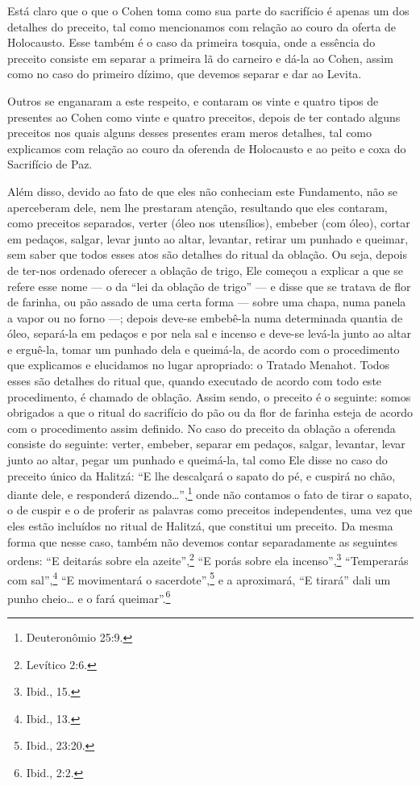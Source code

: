 Está claro que o que o Cohen toma como sua parte do sacrifício é
apenas um dos detalhes do preceito, tal como mencionamos com relação ao
couro da oferta de Holocausto. Esse também é o caso da primeira tosquia,
onde a essência do preceito consiste em separar a primeira lã do
carneiro e dá-la ao Cohen, assim como no caso do primeiro dízimo,
que devemos separar e dar ao Levita.

Outros se enganaram a este respeito, e contaram os vinte e quatro tipos
de presentes ao Cohen como vinte e quatro preceitos, depois de ter
contado alguns preceitos nos quais alguns desses presentes eram meros
detalhes, tal como explicamos com relação ao couro da oferenda de
Holocausto e ao peito e coxa do Sacrifício de Paz.

Além disso, devido ao fato de que eles não conheciam este Fundamento,
não se aperceberam dele, nem lhe prestaram atenção, resultando que eles
contaram, como preceitos separados, verter (óleo nos utensílios),
embeber (com óleo), cortar em pedaços, salgar, levar junto ao altar,
levantar, retirar um punhado e queimar, sem saber que todos esses atos
são detalhes do ritual da oblação. Ou seja, depois de ter-nos ordenado
oferecer a oblação de trigo, Ele começou a explicar a que se refere esse
nome --- o da ``lei da oblação de trigo'' --- e disse que se tratava de
flor de farinha, ou pão assado de uma certa forma --- sobre uma chapa,
numa panela a vapor ou no forno ---; depois deve-se embebê-la numa
determinada quantia de óleo, separá-la em pedaços e por nela sal e
incenso e deve-se levá-la junto ao altar e erguê-la, tomar um punhado
dela e queimá-la, de acordo com o procedimento que explicamos e
elucidamos no lugar apropriado: o Tratado Menahot. Todos esses são
detalhes do ritual que, quando executado de acordo com todo este
procedimento, é chamado de oblação. Assim sendo, o preceito é o
seguinte: somos obrigados a que o ritual do sacrifício do pão ou da flor
de farinha esteja de acordo com o procedimento assim definido. No caso
do preceito da oblação a oferenda consiste do seguinte: verter,
embeber, separar em pedaços, salgar, levantar, levar junto ao altar,
pegar um punhado e queimá-la, tal como Ele disse no caso do preceito
único da Halitzá: ``E lhe descalçará o sapato do pé, e cuspirá no
chão, diante dele, e responderá dizendo\ldots{}'',\footnote{Deuteronômio 25:9.} onde
não contamos o fato de tirar o sapato, o de cuspir e o de proferir as
palavras como preceitos independentes, uma vez que eles estão incluídos
no ritual de Halitzá, que constitui um preceito. Da mesma forma que
nesse caso, também não devemos contar separadamente as seguintes ordens:
``E deitarás sobre ela azeite'',\footnote{Levítico 2:6.} ``E porás sobre ela
incenso'',\footnote{Ibid., 15.} ``Temperarás com sal'',\footnote{Ibid., 13.} ``E
movimentará o sacerdote'',\footnote{Ibid., 23:20.} e a aproximará, ``E tirará''
dali um punho cheio\ldots{} e o fará queimar''.\footnote{Ibid., 2:2.}

